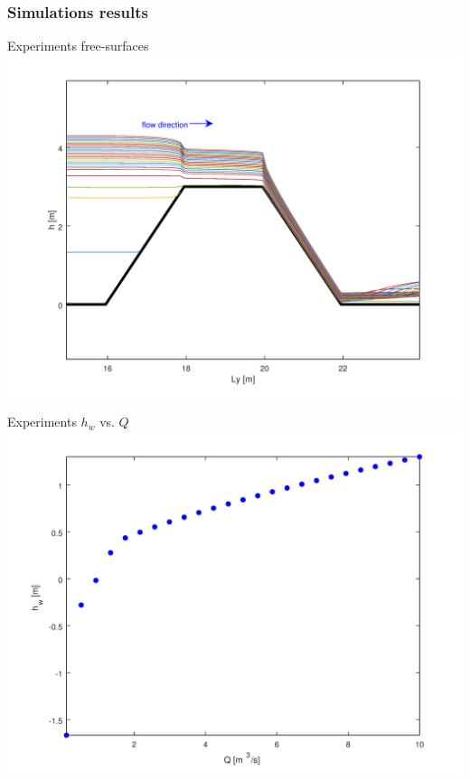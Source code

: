 \documentclass[xcolor=dvipsnames, USenglish]{beamer}  %
\begin{document}
  \begin{frame}
    \frametitle{Simulations results}
    \begin{minipage}{.5\textwidth}
      \centering
      \small{Experiments free-surfaces}\\
      \includegraphics[width=\textwidth]{img/free_surfaces.png}
    \end{minipage}%
    \begin{minipage}{.5\textwidth}
      \centering
      \small{Experiments $h_w$ vs. $Q$}\\
      \includegraphics[width=\textwidth]{img/simulation_results.png}
    \end{minipage}
  \end{frame}
\end{document}
